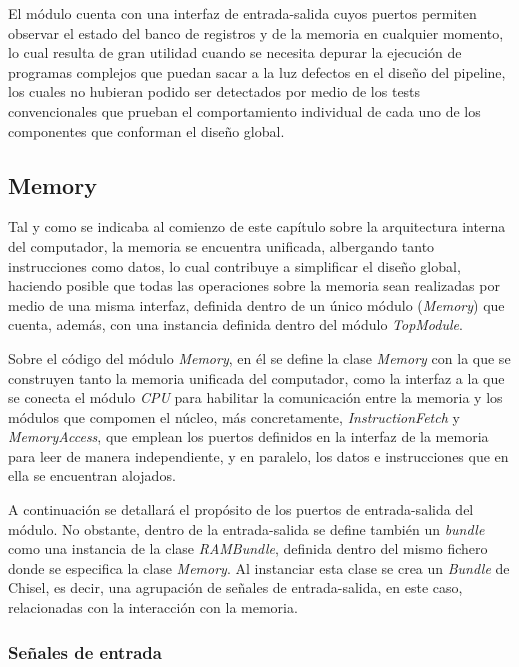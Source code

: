 El módulo cuenta con una interfaz de entrada-salida cuyos puertos permiten observar el estado del banco de registros y de la memoria en cualquier momento, lo cual resulta de gran utilidad cuando se necesita depurar la ejecución de programas complejos que puedan sacar a la luz defectos en el diseño del pipeline, los cuales no hubieran podido ser detectados por medio de los tests convencionales que prueban el comportamiento individual de cada uno de los componentes que conforman el diseño global.

\subsection{Memory}

Tal y como se indicaba al comienzo de este capítulo sobre la arquitectura interna del computador, la memoria se encuentra unificada, albergando tanto instrucciones como datos, lo cual contribuye a simplificar el diseño global, haciendo posible que todas las operaciones sobre la memoria sean realizadas por medio de una misma interfaz, definida dentro de un único módulo (\textit{Memory}) que cuenta, además, con una instancia definida dentro del módulo \textit{TopModule}.

Sobre el código del módulo \textit{Memory}, en él se define la clase \textit{Memory} con la que se construyen tanto la memoria unificada del computador, como la interfaz a la que se conecta el módulo \textit{CPU} para habilitar la comunicación entre la memoria y los módulos que compomen el núcleo, más concretamente, \textit{InstructionFetch} y \textit{MemoryAccess}, que emplean los puertos definidos en la interfaz de la memoria para leer de manera independiente, y en paralelo, los datos e instrucciones que en ella se encuentran alojados.

A continuación se detallará el propósito de los puertos de entrada-salida del módulo. No obstante, dentro de la entrada-salida se define también un \textit{bundle} como una instancia de la clase \textit{RAMBundle}, definida dentro del mismo fichero donde se especifica la clase \textit{Memory}. Al instanciar esta clase se crea un \textit{Bundle} de Chisel, es decir, una agrupación de señales de entrada-salida, en este caso, relacionadas con la interacción con la memoria.

\subsubsection{Señales de entrada}

